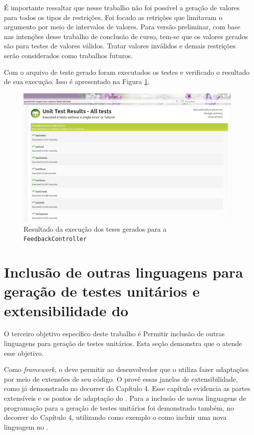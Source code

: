 É importante ressaltar que nesse trabalho não foi possível a geração de valores
para todos os tipos de restrições. Foi focado as retrições que limitavam o
argumento por meio de intervalos de valores. Para versão preliminar, com base
nas intenções desse trabalho de conclusão de curso, tem-se que os valores
gerados são para testes de valores válidos. Tratar valores inválidos e demais
restrições serão considerados como trabalhos futuros.

Com o arquivo de teste gerado foram executados os testes e verificado o resultado
de sua execução. Isso é apresentado na Figura \ref{result-test-controller-feedback}.

\begin{figure}[h]
  \centering
    \includegraphics[width=\textwidth]{figuras/result-test-controller-feedback.png}
    \caption{Resultado da execução dos teses gerados para a \lstinline|FeedbackController|}
    \label{result-test-controller-feedback}
\end{figure}
\FloatBarrier

\section{Inclusão de outras linguagens para geração de testes unitários e extensibilidade do \framework}
O terceiro objetivo específico deste trabalho é \textsf{Permitir inclusão de
outras linguagens para geração de testes unitários}. Esta seção demonstra que
o \scarefault atende esse objetivo.

Como \textit{framework}, o \scarefault deve permitir ao desenvolvedor que o utiliza
fazer adaptações por meio de extensões de seu código. O \scarefault provê
essas janelas de extensibilidade, como já demonstrado no decorrer do
Capítulo 4. Esse capítulo evidencia as partes extensíveis e os pontos de
adaptação do \framework. Para a inclusão de novas linguagens de programação
para a geração de testes unitários foi demonstrado também, no decorrer do
Capítulo 4, utilizando como exemplo o \grails como incluir uma nova linguagem
no \scarefault.

